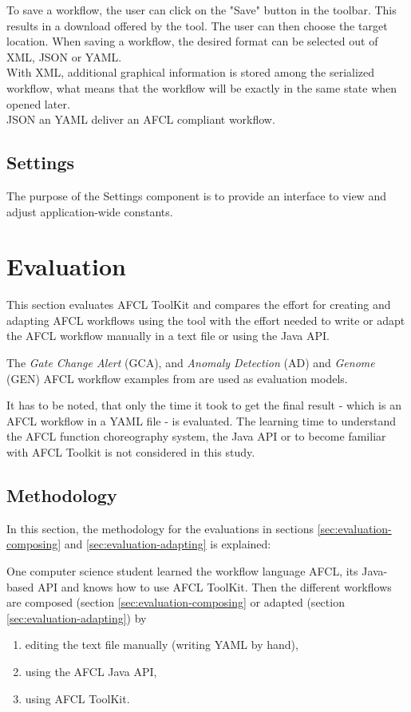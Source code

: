 \documentclass[a4paper,top=25mm,bottom=25mm,12pt,pdftex,halfparskip,twoside,bibtotoc,numbers=noenddot]{scrbook}
\begin{document}
To save a workflow, the user can click on the "Save" button in the toolbar.
This results in a download offered by the tool. The user can then choose the target location.  When saving a workflow, the desired format can be selected out of XML, JSON or YAML.\\
With XML, additional graphical information is stored among the serialized workflow, what means that the workflow will be exactly in the same state when opened later.\\
JSON an YAML deliver an AFCL compliant workflow.

\section{Settings}

The purpose of the Settings component is to provide an interface to view and adjust application-wide constants. 


\chapter{Evaluation}

This section evaluates AFCL ToolKit and compares the effort for creating and adapting AFCL workflows using the tool with the effort needed to write or adapt the AFCL workflow manually in a text file or using the Java API.

The \textit{Gate Change Alert}  (GCA), and \textit{Anomaly Detection} (AD) and \textit{Genome} (GEN) AFCL workflow examples from \citep{online-afcl-dps} are used as evaluation models.

It has to be noted, that only the time it took to get the final result - which is an AFCL workflow in a YAML file - is evaluated.
The learning time to understand the AFCL function choreography system, the Java API or to become familiar with AFCL Toolkit is not considered in this study.

\section{Methodology}

In this section, the methodology for the evaluations in sections \ref{sec:evaluation-composing} and \ref{sec:evaluation-adapting} is explained:

One computer science student learned the workflow language AFCL, its Java-based API and knows how to use AFCL ToolKit.
Then the different workflows are composed (section \ref{sec:evaluation-composing} or adapted (section \ref{sec:evaluation-adapting}) by
\begin{enumerate}[label={(\arabic*)}]
	\item editing the text file manually (writing YAML by hand),
	\item using the AFCL Java API,
	\item using AFCL ToolKit.
\end{enumerate}
\end{document}
